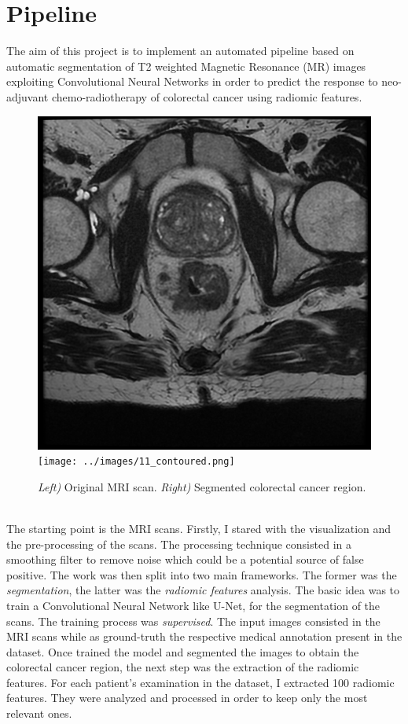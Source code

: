 \documentclass{standalone}
\begin{document}
\chapter{Pipeline}
The aim of this project is to implement an automated pipeline based on automatic segmentation of T2 weighted Magnetic Resonance (MR) images exploiting Convolutional Neural Networks in order to predict the response to neo-adjuvant chemo-radiotherapy of colorectal cancer using radiomic features.
\begin{figure}[htp]

    \centering
    \includegraphics[width=.49\textwidth]{../images/11.png}
    \texttt{[image: ../images/11\_contoured.png]}
    
    \caption{ \textit{ Left)} Original MRI scan.\textit{ Right)} Segmented colorectal cancer region.}
    \label{comparison}
    
    \end{figure}
    \\
The starting point is the MRI scans. 
Firstly, I stared with the visualization and the pre-processing of the scans.
The processing technique consisted in a smoothing filter to remove noise which could be a potential source of false positive.
The work was then split into two main frameworks.
The former was the \textit{segmentation}, the latter was the \textit{radiomic features} analysis.
The basic idea was to train a Convolutional Neural Network like U-Net, for the segmentation of the scans.
The training process was \textit{supervised}. 
The input images consisted in the MRI scans while as ground-truth the respective medical annotation present in the dataset.
Once trained the model and segmented the images to obtain the colorectal cancer region, the next step was the extraction of the radiomic features.
For each patient's examination in the dataset, I extracted 100 radiomic features.
They were analyzed and processed in order to keep only the most relevant ones.
\end{document}
